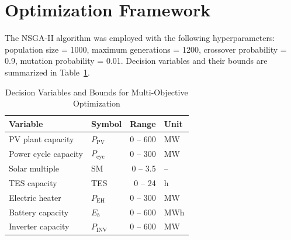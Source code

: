 \documentclass[journal]{IEEEtran}
\begin{document}
\section{Optimization Framework}

The NSGA-II algorithm was employed with the following hyperparameters: population size = 1000, maximum generations = 1200, crossover probability = 0.9, mutation probability = 0.01. Decision variables and their bounds are summarized in Table~\ref{tab:decision_vars}.

\begin{table}[!t]
\centering
\caption{Decision Variables and Bounds for Multi-Objective Optimization}
\label{tab:decision_vars}
\begin{tabular}{llrl}
\toprule
\textbf{Variable} & \textbf{Symbol} & \textbf{Range} & \textbf{Unit} \\
\midrule
PV plant capacity    & $P_{\text{PV}}$    & 0 -- 600  & MW \\
Power cycle capacity & $P_{\text{cyc}}$   & 0 -- 300  & MW \\
Solar multiple       & SM                  & 0 -- 3.5  & -- \\
TES capacity         & TES                 & 0 -- 24   & h \\
Electric heater      & $P_{\text{EH}}$    & 0 -- 300  & MW \\
Battery capacity     & $E_b$                & 0 -- 600  & MWh \\
Inverter capacity    & $P_{\text{INV}}$   & 0 -- 600  & MW \\
\bottomrule
\end{tabular}
\end{table}
\end{document}
